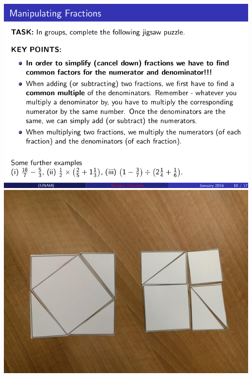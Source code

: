 \documentclass{beamer}
\begin{document}
    \begin{frame}
        \begin{center}
            \includegraphics[width=.3\textwidth]{./assets/example_resources_2015.png}
            \hspace{.1cm}
            \hspace{.1cm}
            \includegraphics[width=.3\textwidth]{./assets/example_resources_2017.png}

            \vfill
        \end{center}

    \end{frame}
\end{document}
